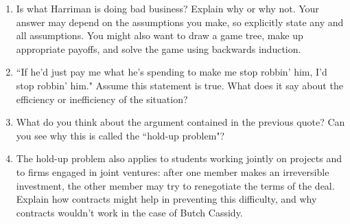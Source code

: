 \begin{enumerate}
    \begin{enumerate}

    \item Is what Harriman is doing bad business? Explain why or why not. Your answer may depend on the assumptions you make, so explicitly state any and all assumptions. You might also want to draw a game tree, make up appropriate payoffs, and solve the game using backwards induction.


    \item ``If he'd just pay me what he's spending to make me stop robbin' him, I'd stop robbin' him." Assume this statement is true. What does it say about the efficiency or inefficiency of the situation?


    \item What do you think about the argument contained in the previous quote? Can you see why this is called the ``hold-up problem"?


    \item The hold-up problem also applies to students working jointly on projects and to firms engaged in joint ventures: after one member makes an irreversible investment, the other member may try to renegotiate the terms of the deal. Explain how contracts might help in preventing this difficulty, and why contracts wouldn't work in the case of Butch Cassidy.

    \end{enumerate}









\end{enumerate}
